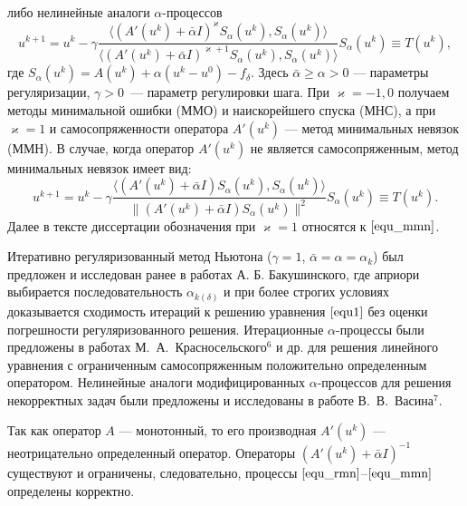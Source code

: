 \documentclass[%
autoref,     %
href,        %
colorlinks,  %
]{disser}
\begin{document}
либо нелинейные аналоги $\alpha$-процессов
\begin{equation}\label{equ_alphaproc}
u^{k+1}=u^k-\gamma\frac{\langle (A'(u^k)+\bar\alpha I)^{\varkappa}S_\alpha(u^k), S_\alpha(u^k)\rangle }{\langle(A'(u^k)+\bar\alpha I)^{\varkappa+1}S_\alpha(u^k), S_\alpha(u^k)\rangle }S_\alpha(u^k)\equiv{T(u^k)},
\end{equation}
где $S_\alpha(u^k)=A(u^k)+\alpha(u^k-u^0)-f_\delta$. Здесь $\bar\alpha \ge \alpha >0$ --- параметры регуляризации, $\gamma>0$~--- параметр регулировки шага. При $\varkappa=-1,0$ получаем методы минимальной ошибки (ММО) и наискорейшего спуска (МНС), а при $\varkappa=1$ и самосопряженности оператора $A'(u^k)$ --- метод минимальных невязок (ММН). В случае, когда оператор $A'(u^k)$ не является самосопряженным, метод минимальных невязок имеет вид:
\begin{equation}\label{equ_mmn}
u^{k+1} =u^k - \gamma\frac{\langle (A'(u^k)+\bar{\alpha}I)S_\alpha(u^k), S_\alpha (u^k)\rangle}{\|(A'(u^k)+\bar{\alpha}I)S_\alpha(u^k)\|^2}S_\alpha (u^k)\equiv{T(u^k)}.
\end{equation}
Далее в тексте диссертации обозначения при $\varkappa=1$ относятся к $\eqref{equ_mmn}$.

Итеративно регуляризованный метод Ньютона ($\gamma=1$, $ \bar\alpha=\alpha={\alpha}_k$) был предложен и исследован ранее в работах А. Б. Бакушинского, где априори выбирается последовательность ${\alpha}_{k(\delta)}$ и при более строгих условиях доказывается сходимость итераций к решению уравнения $\eqref{equ1}$ без оценки погрешности регуляризованного решения. Итерационные $\alpha$-процессы были предложены в работах М.~А.~Красносельского$^6$ и др. для решения линейного уравнения с ограниченным самосопряженным положительно определенным оператором. Нелинейные аналоги модифицированных $\alpha$-процессов для решения некорректных задач были предложены и исследованы в работе В.~В.~Васина$^7$.

{\scriptsize
	\let\thefootnote\relax\let\thefootnote\relax{}
	\let\thefootnote\relax\let\thefootnote\relax{}
}

Так как оператор $A$ --- монотонный, то его производная $A'(u^k)$ --- неотрицательно определенный оператор. Операторы $(A'(u^k)+\bar\alpha I)^{-1}$ существуют и ограничены, следовательно, процессы $\eqref{equ_rmn}$--$\eqref{equ_mmn}$ определены корректно. 
\end{document}
